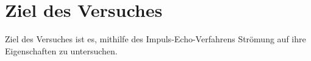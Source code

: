 \section{Ziel des Versuches}
\label{sec:versuchsziel}

Ziel des Versuches ist es, mithilfe des Impuls-Echo-Verfahrens Strömung auf ihre
Eigenschaften zu untersuchen.